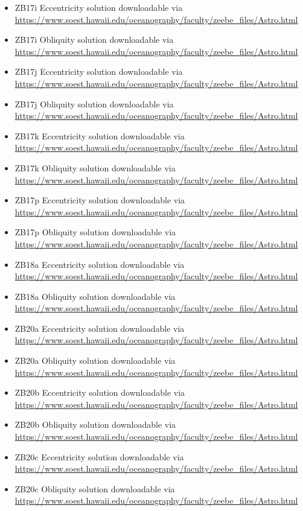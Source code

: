 \documentclass[a4paper]{book}
\begin{document}
\begin{Description}
\begin{itemize}
\item{} ZB17i Eccentricity solution downloadable via \url{https://www.soest.hawaii.edu/oceanography/faculty/zeebe_files/Astro.html}
\item{} ZB17i Obliquity solution downloadable via \url{https://www.soest.hawaii.edu/oceanography/faculty/zeebe_files/Astro.html}
\item{} ZB17j Eccentricity solution downloadable via \url{https://www.soest.hawaii.edu/oceanography/faculty/zeebe_files/Astro.html}
\item{} ZB17j Obliquity solution downloadable via \url{https://www.soest.hawaii.edu/oceanography/faculty/zeebe_files/Astro.html}
\item{} ZB17k Eccentricity solution downloadable via \url{https://www.soest.hawaii.edu/oceanography/faculty/zeebe_files/Astro.html}
\item{} ZB17k Obliquity solution downloadable via \url{https://www.soest.hawaii.edu/oceanography/faculty/zeebe_files/Astro.html}
\item{} ZB17p Eccentricity solution downloadable via \url{https://www.soest.hawaii.edu/oceanography/faculty/zeebe_files/Astro.html}
\item{} ZB17p Obliquity solution downloadable via \url{https://www.soest.hawaii.edu/oceanography/faculty/zeebe_files/Astro.html}
\item{} ZB18a Eccentricity solution downloadable via \url{https://www.soest.hawaii.edu/oceanography/faculty/zeebe_files/Astro.html}
\item{} ZB18a Obliquity solution downloadable via \url{https://www.soest.hawaii.edu/oceanography/faculty/zeebe_files/Astro.html}
\item{} ZB20a Eccentricity solution downloadable via \url{https://www.soest.hawaii.edu/oceanography/faculty/zeebe_files/Astro.html}
\item{} ZB20a Obliquity solution downloadable via \url{https://www.soest.hawaii.edu/oceanography/faculty/zeebe_files/Astro.html}
\item{} ZB20b Eccentricity solution downloadable via \url{https://www.soest.hawaii.edu/oceanography/faculty/zeebe_files/Astro.html}
\item{} ZB20b Obliquity solution downloadable via \url{https://www.soest.hawaii.edu/oceanography/faculty/zeebe_files/Astro.html}
\item{} ZB20c Eccentricity solution downloadable via \url{https://www.soest.hawaii.edu/oceanography/faculty/zeebe_files/Astro.html}
\item{} ZB20c Obliquity solution downloadable via \url{https://www.soest.hawaii.edu/oceanography/faculty/zeebe_files/Astro.html}

\end{itemize}
\end{Description}
\end{document}
